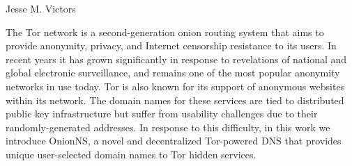 \begin{publicabstract}
\centerline{Jesse M. Victors}
\vspace{12pt}

The Tor network is a second-generation onion routing system that aims to provide anonymity, privacy, and Internet censorship resistance to its users. In recent years it has grown significantly in response to revelations of national and global electronic surveillance, and remains one of the most popular anonymity networks in use today. Tor is also known for its support of anonymous websites within its network. The domain names for these services are tied to distributed public key infrastructure but suffer from usability challenges due to their randomly-generated addresses. In response to this difficulty, in this work we introduce OnionNS, a novel and decentralized Tor-powered DNS that provides unique user-selected domain names to Tor hidden services.

\end{publicabstract}
